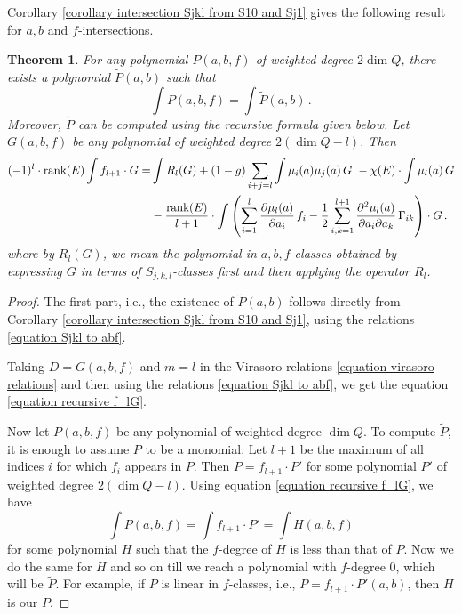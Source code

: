 \documentclass[11pt]{amsart}
\newtheorem{theorem}{Theorem}
\theoremstyle{remark}
\newcommand{\p}{\partial}
\newcommand{\rk}{\textnormal{rank}}
\newcommand{\wt}[1]{\widetilde{#1}}
\numberwithin{theorem}{section}
\begin{document}
Corollary \ref{corollary intersection Sjkl from S10 and Sj1} gives the following result for $a,b$ and $f$-intersections.
\begin{theorem}\label{theorem intersection fl times P}
    For any polynomial $P(a,b,f)$ of weighted degree $2\dim Q$, 
    there exists a polynomial $\wt P(a,b)$
    such that
    $$ \int P(a,b,f) = \int \wt P(a,b)\,.$$
    Moreover, $\wt P$ can be computed using the recursive formula given below.
    Let $G(a,b,f)$ be any polynomial 
    of weighted degree $2(\dim Q - l)$.
    Then 
    \begin{align}\label{equation recursive f_lG}
    \nonumber
        (-1)^{l} \cdot \rk(E) \int f_{l+1} \cdot G = &\int R_l(G) + 
        (1-g) \sum_{i+j=l} \int \mu_i(a) \mu_j(a) \, G \ - \chi(E) \cdot \int \mu_l(a)\, G \\
        & - \frac{\rk(E)}{l+1} \cdot \int \left(
        \sum_{i=1}^{l} \frac{\p \mu_l(a)}{\p a_i} \, f_i 
        - \frac{1}{2} \sum_{i,k=1}^{l+1} \frac{\p^2 \mu_l(a)}{\p a_i \p a_k} \, \Gamma_{ik}
        \right) \cdot G \,.
    \end{align}
    where by ${R_l(G)}$, we mean the polynomial in $a,b,f$-classes
    obtained by expressing 
    $G$ in terms of $S_{j,k,l}$-classes first and then
    applying the operator $R_l$.
\end{theorem}
\begin{proof}
    The first part, i.e., the existence of $\wt P(a,b)$ 
    follows directly from
    Corollary \ref{corollary intersection Sjkl from S10 and Sj1},
    using the relations \eqref{equation Sjkl to abf}.

    Taking $D=G(a,b,f)$ and $m=l$ in the Virasoro relations \eqref{equation virasoro relations} and then using the 
    relations \eqref{equation Sjkl to abf}, 
    we get the equation \eqref{equation recursive f_lG}.

    Now let $P(a,b,f)$ be any polynomial of weighted degree $\dim Q$.
    To compute $\wt P$, it is enough to assume $P$ to be a monomial.
    Let $l+1$ be the maximum of all indices $i$ for which $f_i$ appears in $P$.
    Then $P = f_{l+1} \cdot P'$ for some polynomial $P'$ of weighted degree $2(\dim Q - l)$.
    Using equation \eqref{equation recursive f_lG}, we have
    $$ \int P(a,b,f) = \int f_{l+1} \cdot P' = \int H(a,b,f)$$
    for some polynomial $H$
    such that the $f$-degree of $H$ is less than that of $P$.
    Now we do the same for $H$ and so on till we reach a polynomial with $f$-degree 0, which will be $\wt P$.
    For example, if $P$ is linear in $f$-classes, i.e.,
    $P = f_{l+1} \cdot P'(a,b)$, then $H$ is our $\wt P$. 
\end{proof}
\end{document}
